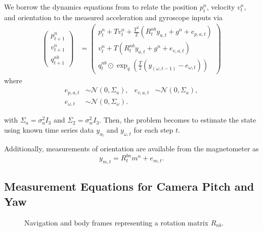 \documentclass{article}
\begin{document}
We borrow the dynamics equations from \cite{introtoiner} to relate the position $p_t^n$, velocity $v_t^n$, and orientation to the measured acceleration and gyroscope inputs via
\begin{align}
\begin{pmatrix}
    p_{t + 1}^n\\
    v_{t + 1}^n\\
    q_{t + 1}^{nb}
    \end{pmatrix} &=
    \begin{pmatrix}
    p_t^n + T v_t^n + \frac{T^2}{2}(R_t^{nb}  y_{a,t} + g^n + e_{p,a,t})\\
    v_t^n + T (R_t^{nb}  y_{a,t} + g^n + e_{v,a,t})\\
    q_{t}^{nb} \odot \exp_q\left(\frac{T}{2} (y_(\omega, t-1) - e_{\omega,t})\right)
    \end{pmatrix}
\end{align}
where 
\begin{align*}
    e_{p,a,t} &\sim \mathcal{N}(0, \Sigma_a), 
    &e_{v,a,t} &\sim \mathcal{N}(0, \Sigma_a),\\
    e_{\omega,t} &\sim \mathcal{N}(0, \Sigma_\omega).
\end{align*}

with $\Sigma_a = \sigma_a^2 I_3$ and $\Sigma_2 = \sigma_w^2 I_3$. Then, the problem becomes to estimate the state using known time series data $y_{a_t}$ and $y_{\omega,t}$ for each step $t$.

Additionally, measurements of orientation are available from the magnetometer as
\begin{equation}
    y_{m,t} = R_t^{bn} m^n + e_{m,t}.
\end{equation}


\subsection{Measurement Equations for Camera Pitch and Yaw}
\label{sec:pitchyawmeas}
\begin{figure}[htbp]%
    \centering
    \caption{Navigation and body frames representing a rotation matrix $R_{nb}$.}%
    \label{fig:frames}
\end{figure}
\end{document}
